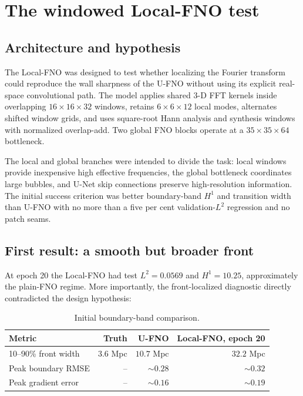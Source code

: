 \documentclass[11pt,a4paper]{article}
\newcommand{\Ltwo}{L^2}
\newcommand{\Hone}{H^1}
\begin{document}
\section{The windowed Local-FNO test}

\subsection{Architecture and hypothesis}

The Local-FNO was designed to test whether localizing the Fourier transform
could reproduce the wall sharpness of the U-FNO without using its explicit
real-space convolutional path. The model applies shared 3-D FFT kernels inside
overlapping \(16\times16\times32\) windows, retains
\(6\times6\times12\) local modes, alternates shifted window grids, and uses
square-root Hann analysis and synthesis windows with normalized overlap-add.
Two global FNO blocks operate at a \(35\times35\times64\) bottleneck.

The local and global branches were intended to divide the task:
local windows provide inexpensive high effective frequencies, the global
bottleneck coordinates large bubbles, and U-Net skip connections preserve
high-resolution information. The initial success criterion was better
boundary-band \(\Hone\) and transition width than U-FNO with no more than a
five per cent validation-\(\Ltwo\) regression and no patch seams.

\subsection{First result: a smooth but broader front}

At epoch 20 the Local-FNO had test \(\Ltwo=0.0569\) and
\(\Hone=10.25\), approximately the plain-FNO regime. More importantly, the
front-localized diagnostic directly contradicted the design hypothesis:
\begin{table}[H]
\centering
\caption{Initial boundary-band comparison.}
\begin{tabular}{@{}lrrr@{}}
\toprule
Metric & Truth & U-FNO & Local-FNO, epoch 20 \\
\midrule
10--90\% front width & \(3.6\) Mpc & \(10.7\) Mpc & \(32.2\) Mpc \\
Peak boundary RMSE & -- & \(\sim0.28\) & \(\sim0.32\) \\
Peak gradient error & -- & \(\sim0.16\) & \(\sim0.19\) \\
\bottomrule
\end{tabular}
\end{table}
\end{document}
